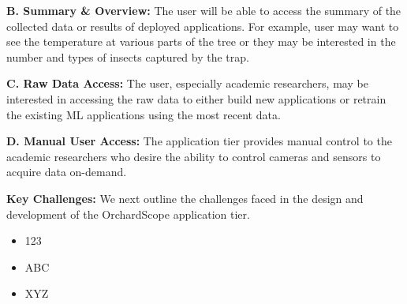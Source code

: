 \noindent
\textbf{B. Summary \& Overview:} The user will be able to access the summary of the collected data or results of deployed applications. For example, user may want to see the temperature at various parts of the tree or they may be interested in the number and types of insects captured by the trap. 

\noindent
\textbf{C. Raw Data Access:} The user, especially academic researchers, may be interested in accessing the raw data to either build new applications or retrain the existing ML applications using the most recent data. 

\noindent
\textbf{D. Manual User Access:} The application tier provides manual control to the academic researchers who desire the ability to control cameras and sensors to acquire data on-demand. 

\noindent
\textbf{Key Challenges:} We next outline the challenges faced in the design and development of the OrchardScope application tier. 
\begin{itemize}
    \item 123
    \item ABC
    \item XYZ 
\end{itemize}






